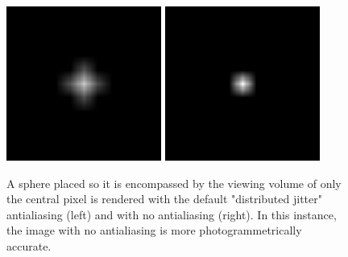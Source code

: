 \begin{figure}[H]
	\centering
	\includegraphics[height = 2in]{../fig/antiyes}
	\includegraphics[height = 2in]{../fig/antino}
	
	\caption{A sphere placed so it is encompassed by the viewing volume of only the central pixel is rendered with the default "distributed jitter" antialiasing (left) and with no antialiasing (right).  In this instance, the image with no antialiasing is more photogrammetrically accurate.}
	\label{fig:aliasing}
\end{figure}